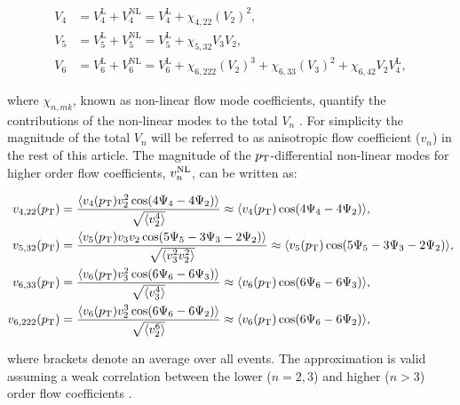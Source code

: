 \vspace{-0.55cm}
\begin{align}
V_{4} &= V_{4}^{\mathrm{L}} + V_{4}^{\mathrm{NL}} = V_{4}^{\mathrm{L}} + \chi_{4,22}(V_{2})^2, \nonumber \\
V_{5} &= V_{5}^{\mathrm{L}} + V_{5}^{\mathrm{NL}} = V_{5}^{\mathrm{L}} + \chi_{5,32}V_{3}V_{2}, \nonumber \\
V_{6} &= V_{6}^{\mathrm{L}} + V_{6}^{\mathrm{NL}} = V_{6}^{\mathrm{L}} + \chi_{6,222}(V_{2})^3 + \chi_{6,33}(V_{3})^2 + \chi_{6,42}V_{2}V_{4}^{\mathrm{L}},
\label{Eq:V4V5V6}
\end{align}
\vspace{-0.55cm}

where $\chi_{n,mk}$, known as non-linear flow mode coefficients, quantify the contributions of the non-linear modes to the total $V_{n}$ \cite{Yan:2015jma, Acharya:2017zfg}. For simplicity the magnitude of the total $V_{n}$ will be referred to as anisotropic flow coefficient ($v_{n}$) in the rest of this article. 
The magnitude of the $p_{\rm{T}}$-differential non-linear modes for higher order flow coefficients, $v_{n}^{\rm{NL}}$, can be written as: 

\begin{align}
v_{4,22}(p_{\rm{T}})&= \frac{\langle v_{4}(p_{\rm{T}})v_{2}^{2}\cos(4\Psi_{4}-4\Psi_{2})\rangle}{\sqrt{\langle v_{2}^{4}\rangle}} \approx \langle v_{4}(p_{\rm{T}})\cos(4\Psi_{4}-4\Psi_{2})\rangle, \label{Eq:V422}\\
v_{5,32}(p_{\rm{T}})&= \frac{\langle v_{5}(p_{\rm{T}})v_{3}v_{2}\cos(5\Psi_{5}-3\Psi_{3}-2\Psi_{2})\rangle}{\sqrt{\langle v_{3}^{2}v_{2}^{2}\rangle}} \approx \langle v_{5}(p_{\rm{T}})\cos(5\Psi_{5}-3\Psi_{3}-2\Psi_{2})\rangle, \label{Eq:V532}\\
v_{6,33}(p_{\rm{T}}) &= \frac{\langle v_{6}(p_{\rm{T}})v_{3}^{2}\cos(6\Psi_{6}-6\Psi_{3})\rangle}{\sqrt{\langle v_{3}^{4}\rangle}} \approx \langle v_{6}(p_{\rm{T}})\cos(6\Psi_{6}-6\Psi_{3})\rangle , \label{Eq:V633}\\
v_{6,222}(p_{\rm{T}}) &= \frac{\langle v_{6}(p_{\rm{T}})v_{2}^{3}\cos(6\Psi_{6}-6\Psi_{2})\rangle}{\sqrt{\langle v_{2}^{6}\rangle}} \approx \langle v_{6}(p_{\rm{T}})\cos(6\Psi_{6}-6\Psi_{2})\rangle,
\label{Eq:V6222}
\end{align}

\noindent where brackets denote an average over all events. The approximation is valid assuming a weak correlation between the lower ($n=2,3$) and higher ($n>3$) order flow coefficients \cite{Acharya:2017gsw, Bhalerao:2014xra}.

